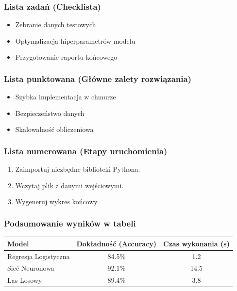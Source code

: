 \documentclass{article}
\begin{document}
\subsubsection{Lista zadań (Checklista)} 
\begin{itemize} 
\item[\textsf{[x]}] Zebranie danych testowych 
\item[\textsf{[ ]}] Optymalizacja hiperparametrów modelu 
\item[\textsf{[ ]}] Przygotowanie raportu końcowego 
\end{itemize} 

\subsubsection{Lista punktowana (Główne zalety rozwiązania)} 
\begin{itemize} 
\item Szybka implementacja w chmurze 
\item Bezpieczeństwo danych 
\item Skalowalność obliczeniowa 
\end{itemize} 

\subsubsection{Lista numerowana (Etapy uruchomienia)} 
\begin{enumerate} 
\item Zaimportuj niezbędne biblioteki Pythona. 
\item Wczytaj plik z danymi wejściowymi. 
\item Wygeneruj wykres końcowy. 
\end{enumerate} 

\subsubsection{Podsumowanie wyników w tabeli} 
\begin{table}[h!] 
\centering 
\begin{tabular}{lcc} 
\toprule 
\textbf{Model} & \textbf{Dokładność (Accuracy)} & \textbf{Czas wykonania (s)} \\ 
\midrule 
Regresja Logistyczna & 84.5\% & 1.2 \\ 
Sieć Neuronowa & 92.1\% & 14.5 \\ 
Las Losowy & 89.4\% & 3.8 \\ 
\bottomrule 
\end{tabular} 
\end{table} 
\end{document}

